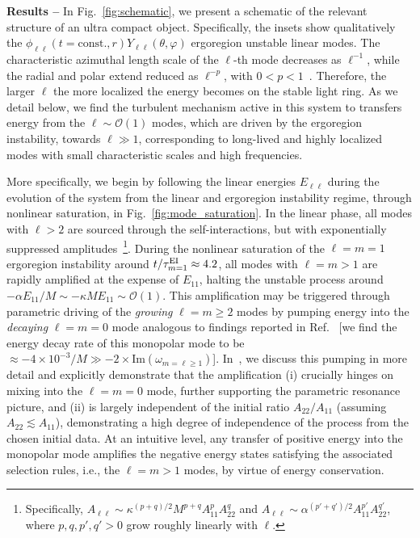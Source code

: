 \documentclass[aps,prl,notitlepage,superscriptaddress,twocolumn]{revtex4-1}
\newcommand{\red}[1]{{{#1}}}
\begin{document}
\textbf{Results --} \red{In Fig.~\ref{fig:schematic}, we present a schematic of the relevant structure of an ultra compact object. Specifically, the insets show qualitatively the $\phi_{\ell\ell}(t=\text{const.},r)Y_{\ell\ell}(\theta,\varphi)$ ergoregion unstable linear modes. The characteristic azimuthal length scale of the $\ell$-th mode decreases as $\ell^{-1}$, while the radial and polar extend reduced as $\ell^{-p}$, with $0<p<1$~\cite{Cardoso:2014sna}. Therefore, the larger $\ell$ the more localized the energy becomes on the stable light ring. As we detail below, we find the turbulent mechanism active in this system to transfers energy from the $\ell\sim \mathcal{O}(1)$ modes, which are driven by the ergoregion instability, towards $\ell\gg 1$, corresponding to long-lived and highly localized modes with small characteristic scales and high frequencies.}

\red{More specifically, we begin by following the linear energies} $E_{\ell\ell}$ during the evolution of the system from the linear and ergoregion instability regime, through nonlinear saturation, in Fig.~\ref{fig:mode_saturation}. In the linear phase, all modes with $\ell>2$ are sourced through the self-interactions, but with exponentially suppressed amplitudes~\footnote{Specifically, $A_{\ell\ell}\sim \kappa^{(p+q)/2} M^{p+q} A_{11}^p A_{22}^q$ and $A_{\ell\ell}\sim \alpha^{(p'+q')/2} A_{11}^{p'} A_{22}^{q'}$, where $p,q,p',q'>0$ grow roughly linearly with $\ell$.}. During the nonlinear saturation of the $\ell=m=1$ ergoregion instability around $t/\tau^{\rm EI}_{m=1}\approx 4.2$, all modes with $\ell=m > 1$ are rapidly amplified at the expense of $E_{11}$, halting the unstable process around $-\alpha E_{11}/M\sim-\kappa M E_{11}\sim\mathcal{O}(1)$. This amplification may be triggered through parametric driving of the \textit{growing} $\ell=m\geq 2$ modes by pumping energy into the \textit{decaying} $\ell=m=0$ mode analogous to findings reported in Ref.~\cite{Baryakhtar:2020gao} [we find the energy decay rate of this monopolar mode to be $\approx -4\times 10^{-3}/M\gg -2\times \text{Im}(\omega_{m=\ell\geq 1})$]. In~\cite{sm}, we discuss this pumping in more detail and explicitly demonstrate that the amplification (i) crucially hinges on mixing into the $\ell=m=0$ mode, further supporting the parametric resonance picture, and (ii) is largely independent of the initial ratio $A_{22}/A_{11}$ (assuming $A_{22}\lesssim A_{11}$), demonstrating a high degree of independence of the process from the chosen initial data. At an intuitive level, any transfer of positive energy into the monopolar mode amplifies the negative energy states satisfying the associated selection rules, i.e., the $\ell=m>1$ modes, by virtue of energy conservation.
\end{document}
